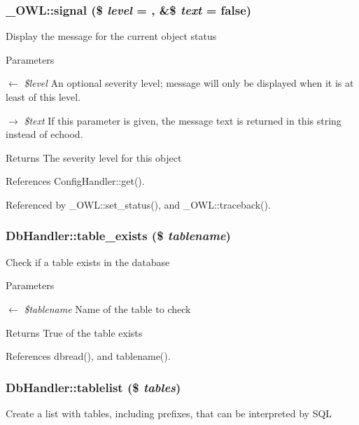 \subsubsection[{signal}]{\setlength{\rightskip}{0pt plus 5cm}\_\-OWL::signal (\$ {\em level} = {}, \/  \&\$ {\em text} = {\ttfamily false})}\label{class__OWL_a51ba4a16409acf2a2f61f286939091a5}
Display the message for the current object status


\begin{DoxyParams}{Parameters}
\item[\mbox{$\leftarrow$} {\em \$level}]An optional severity level; message will only be displayed when it is at least of this level. \item[\mbox{$\rightarrow$} {\em \$text}]If this parameter is given, the message text is returned in this string instead of echood. \end{DoxyParams}
\begin{DoxyReturn}{Returns}
The severity level for this object 
\end{DoxyReturn}


References ConfigHandler::get().



Referenced by \_\-OWL::set\_\-status(), and \_\-OWL::traceback().

\subsubsection[{table\_\-exists}]{\setlength{\rightskip}{0pt plus 5cm}DbHandler::table\_\-exists (\$ {\em tablename})}\label{classDbHandler_a11e750a2c46022241eba49df81607ba9}
Check if a table exists in the database 
\begin{DoxyParams}{Parameters}
\item[\mbox{$\leftarrow$} {\em \$tablename}]Name of the table to check \end{DoxyParams}
\begin{DoxyReturn}{Returns}
True of the table exists 
\end{DoxyReturn}


References dbread(), and tablename().

\subsubsection[{tablelist}]{\setlength{\rightskip}{0pt plus 5cm}DbHandler::tablelist (\$ {\em tables})}\label{classDbHandler_a2b6376ab821eb4aa2f086d852099c6c1}
Create a list with tables, including prefixes, that can be interpreted by SQL


